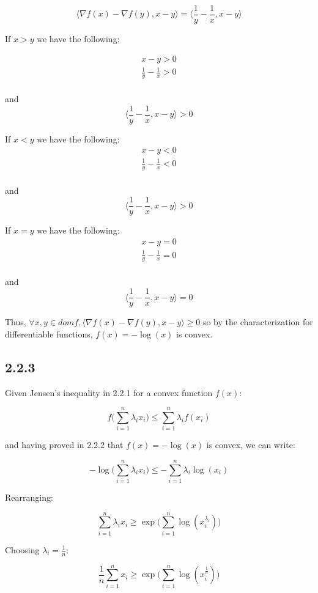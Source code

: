\documentclass[12pt]{article}
\begin{document}
\[\langle \nabla f(x) - \nabla f(y), x-y \rangle = \langle \frac{1}{y}-\frac{1}{x}, x-y \rangle\]

If $x>y$ we have the following:

\begin{gather*}
    x-y>0\\
    \frac{1}{y} - \frac{1}{x} > 0\\
\end{gather*}

and
\[\langle \frac{1}{y}-\frac{1}{x}, x-y \rangle > 0\]

If $x<y$ we have the following:
\begin{gather*}
    x-y<0\\
    \frac{1}{y} - \frac{1}{x} < 0\\
\end{gather*}

and
\[\langle \frac{1}{y}-\frac{1}{x}, x-y \rangle > 0\]

If $x=y$ we have the following:
\begin{gather*}
    x-y=0\\
    \frac{1}{y} - \frac{1}{x} = 0\\
\end{gather*}

and
\[\langle \frac{1}{y}-\frac{1}{x}, x-y \rangle = 0\]

Thus, $\forall x, y \in dom f, \langle \nabla f(x) - \nabla f(y), x-y \rangle \geq 0$ so by the characterization for differentiable functions, $f(x) = -\log(x)$ is convex. \square

\subsection*{2.2.3}

Given Jensen's inequality in 2.2.1 for a convex function $f(x)$:

\[f\bigg(\sum_{i=1}^n \lambda_i x_i\bigg) \leq \sum_{i=1}^n \lambda_i f(x_i)\]

and having proved in 2.2.2 that $f(x) = -\log(x)$ is convex, we can write:

\[-\log\bigg(\sum_{i=1}^n \lambda_i x_i\bigg) \leq - \sum_{i=1}^n \lambda_i \log(x_i)\]

Rearranging:

\[\sum_{i=1}^n \lambda_i x_i \geq \exp \bigg(\sum_{i=1}^n \log(x_i^{\lambda_i}) \bigg)\]


Choosing $\lambda_i = \frac{1}{n}$:

\[\frac{1}{n}\sum_{i=1}^n x_i \geq \exp \bigg(\sum_{i=1}^n \log(x_i^{\frac{1}{n}}) \bigg)\]
\end{document}
